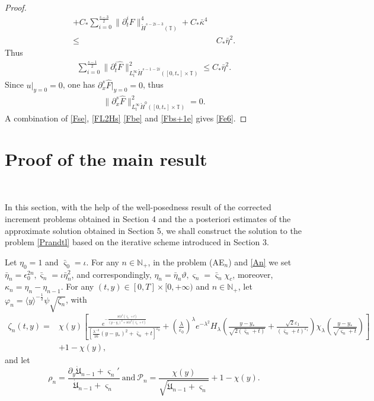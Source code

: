 \documentclass{amsart}
\numberwithin{equation}{section}
\newcommand\y{{{\langle y \rangle}}}
\begin{document}
\begin{proof}
\begin{align*}
     +C_{*}\sum_{i=0}^{\frac{s-3}{2}}\|\partial_{t}^{i}F\|_{\mathring{H}^{s-2i-3}(\mathbb{T})}^{4}
     +C_{*}\bar{\kappa}^{4}\\
\leq&~C_{*}\bar{\eta}^{2}.
\end{align*}
Thus
\begin{align}\label{Fbe}
\sum_{i=0}^{\frac{s-1}{2}}\|\partial_{t}^{i}\hat{F}\|_{L_{t}^{\infty}\mathring{H}^{s-1-2i}([0,t_{*}]\times\mathbb{T})}^{2}
\leq C_{*}\bar{\eta}^{2}.
\end{align}
Since $u|_{y=0}=0$, one has $\partial_{x}^{s}\hat{F}|_{y=0}=0$, thus
\begin{align}\label{Fbs+1e}
\|\partial_{x}^{s}\hat{F}\|_{L_{t}^{\infty}\mathring{H}^{0}([0,t_{*}]\times\mathbb{T})}^{2}=0.
\end{align}
A combination of \eqref{Fse}, \eqref{FL2Hs} \eqref{Fbe} and \eqref{Fbs+1e} gives \eqref{Fe6}.

\end{proof}

\section{Proof of the main result}~

In this section, with the help of the well-posedness result of the corrected increment problems obtained in Section 4 and the a posteriori estimates of the approximate solution obtained in Section 5, we shall construct the solution to the problem \eqref{Prandtl} based on the iterative scheme introduced in Section 3.

Let $\eta_{0}=1$ and $\bar{\varsigma}_{0}=\iota$. For any $n\in\mathbb{N}_{+}$, in the problem (AE$_{n}$) and \eqref{An} we set
$\bar{\eta}_{n}=\epsilon_{0}^{2n}, \bar{\varsigma}_{n}=\iota\bar{\eta}_{n}^{2}$,
and correspondingly, $\eta_{n}=\bar{\eta}_{n}\vartheta, \varsigma_{n}=\bar{\varsigma}_{n}\chi_{c}$, moreover, $\kappa_{n}=\eta_{n}-\eta_{n-1}$.
For any $(t,y)\in [0,T]\times[0,+\infty)$ and $n\in\mathbb{N}_{+}$, let $\varphi_{n}=\y^{-\frac{1}{2}}\psi\sqrt{\zeta_{n}}$, with
\begin{align*}
\zeta_{n}(t,y)
=&\chi(y)\left[\frac{e^{-\frac{16\lambda^{4}(\bar{\varsigma}_{n}+t)}{(y-y_{*})^{2}+16\lambda^{2}(\bar{\varsigma}_{n}+t)}}}{[\frac{\lambda^{-2}}{16}(y-y_{*})^{2}+\bar{\varsigma}_{n}+t]^{\varepsilon_{0}}}
  +\left(\frac{\lambda}{\varepsilon_{0}}\right)^{\lambda}e^{-\lambda^{2}}H_{\lambda}\left(\frac{y-y_{*}}{\sqrt{2(\bar{\varsigma}_{n}+t)}}+\frac{\sqrt{2}\varepsilon_{1}}{(\bar{\varsigma}_{n}+t)^{\varepsilon_{1}}}\right)\chi_{\lambda}\left(\frac{y-y_{*}}{\sqrt{\bar{\varsigma}_{n}+t}}\right)\right]\\
 &+1-\chi(y),
\end{align*}
and let
$$\rho_{n}=\frac{\partial_{y}\dot{\mathfrak{U}}_{n-1}+\varsigma_{n}'}{\dot{\mathfrak{U}}_{n-1}+\varsigma_{n}}
~\text{and}~
\mathcal{P}_{n}=\frac{\chi(y)}{\sqrt{\dot{\mathfrak{U}}_{n-1}+\varsigma_{n}}}+1-\chi(y).$$
\end{document}
